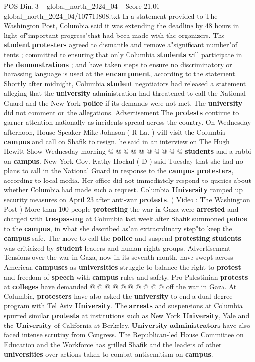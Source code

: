 \begin{textsample}{POS Dim 3 – global\_north\_2024\_04 – Score 21.00 – global\_north\_2024\_04/107710808.txt}
In a statement provided to The Washington Post, Columbia said it was extending the deadline by 48 hours in light of"important progress"that had been made with the organizers.
The \textbf{student} \textbf{protesters} agreed to dismantle and remove a"significant number"of tents ; committed to ensuring that only Columbia \textbf{students} will participate in the \textbf{demonstrations} ; and have taken steps to ensure no discriminatory or harassing language is used at the \textbf{encampment}, according to the statement.
Shortly after midnight, Columbia \textbf{student} negotiators had released a statement alleging that the \textbf{university} administration had threatened to call the National Guard and the New York \textbf{police} if its demands were not met.
The \textbf{university} did not comment on the allegations.
Advertisement The \textbf{protests} continue to garner attention nationally as incidents spread across the country.
On Wednesday afternoon, House Speaker Mike Johnson ( R-La. ) will visit the Columbia \textbf{campus} and call on Shafik to resign, he said in an interview on The Hugh Hewitt Show Wednesday morning @ @ @ @ @ @ @ @ @ @ \textbf{students} and a rabbi on \textbf{campus}.
New York Gov.
Kathy Hochul ( D ) said Tuesday that she had no plans to call in the National Guard in response to the \textbf{campus} \textbf{protesters}, according to local media.
Her office did not immediately respond to queries about whether Columbia had made such a request.
Columbia \textbf{University} ramped up security measures on April 23 after anti-war \textbf{protests}. ( Video : The Washington Post ) More than 100 people \textbf{protesting} the war in Gaza were \textbf{arrested} and charged with \textbf{trespassing} at Columbia last week after Shafik summoned \textbf{police} to the \textbf{campus}, in what she described as"an extraordinary step"to keep the \textbf{campus} safe.
The move to call the \textbf{police} and suspend \textbf{protesting} \textbf{students} was criticized by \textbf{student} leaders and human rights groups.
Advertisement Tensions over the war in Gaza, now in its seventh month, have swept across American \textbf{campuses} as \textbf{universities} struggle to balance the right to \textbf{protest} and freedom of \textbf{speech} with \textbf{campus} rules and safety.
Pro-Palestinian \textbf{protests} at \textbf{colleges} have demanded @ @ @ @ @ @ @ @ @ @ off the war in Gaza.
At Columbia, \textbf{protesters} have also asked the \textbf{university} to end a dual-degree program with Tel Aviv \textbf{University}.
The \textbf{arrests} and suspensions at Columbia spurred similar \textbf{protests} at institutions such as New York \textbf{University}, Yale and the \textbf{University} of California at Berkeley. \textbf{University} \textbf{administrators} have also faced intense scrutiny from Congress.
The Republican-led House Committee on Education and the Workforce has grilled Shafik and the leaders of other \textbf{universities} over actions taken to combat antisemitism on \textbf{campus}.


\end{textsample}
